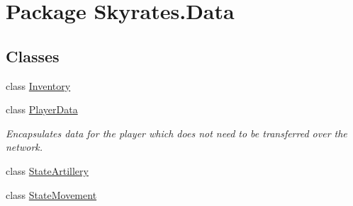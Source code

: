 \hypertarget{namespace_skyrates_1_1_data}{\section{Package Skyrates.\-Data}
\label{namespace_skyrates_1_1_data}
}
\subsection*{Classes}
\begin{DoxyCompactItemize}
\item 
class \hyperlink{class_skyrates_1_1_data_1_1_inventory}{Inventory}
\item 
class \hyperlink{class_skyrates_1_1_data_1_1_player_data}{Player\-Data}
\begin{DoxyCompactList}\small\item\em Encapsulates data for the player which does not need to be transferred over the network. \end{DoxyCompactList}\item 
class \hyperlink{class_skyrates_1_1_data_1_1_state_artillery}{State\-Artillery}
\item 
class \hyperlink{class_skyrates_1_1_data_1_1_state_movement}{State\-Movement}
\end{DoxyCompactItemize}

